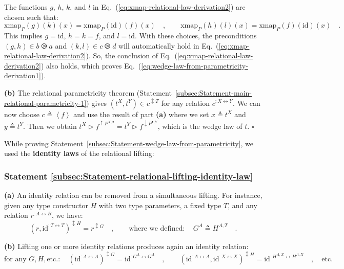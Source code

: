 The functions $g$, $h$, $k$, and $l$ in Eq.~(\ref{eq:xmap-relational-law-derivation2})
are chosen such that:
\[
\text{xmap}_{P}(g)(k)(x)=\text{xmap}_{P}(\text{id})(f)(x)\quad,\quad\quad\text{xmap}_{P}(h)(l)(x)=\text{xmap}_{P}(f)(\text{id})(x)\quad.
\]
This implies $g=\text{id}$, $h=k=f$, and $l=\text{id}$. With these
choices, the preconditions $(g,h)\in b\ogreaterthan a$ and $(k,l)\in c\ogreaterthan d$
will automatically hold in Eq.~(\ref{eq:xmap-relational-law-derivation2}).
So, the conclusion of Eq.~(\ref{eq:xmap-relational-law-derivation2})
also holds, which proves Eq.~(\ref{eq:wedge-law-from-parametricity-derivation1}). 

\textbf{(b)} The relational parametricity theorem (Statement~\ref{subsec:Statement-main-relational-parametricity-1})
gives $(t^{X},t^{Y})\in c^{\updownarrow T}$ for any relation $c^{:X\leftrightarrow Y}$.
We can now choose $c\triangleq\left<f\right>$ and use the result
of part \textbf{(a)} where we set $x\triangleq t^{X}$ and $y\triangleq t^{Y}$.
Then we obtain $t^{X}\triangleright f^{\uparrow P^{X,\bullet}}=t^{Y}\triangleright f^{\downarrow P^{\bullet,Y}}$,
which is the wedge law of $t$. $\square$

While proving Statement~\ref{subsec:Statement-wedge-law-from-parametricity},
we used the \textbf{identity laws}
of the relational lifting:

\subsubsection{Statement \label{subsec:Statement-relational-lifting-identity-law}\ref{subsec:Statement-relational-lifting-identity-law}}

\textbf{(a)} An identity relation can be removed from a simultaneous
lifting. For instance, given any type constructor $H$ with two type
parameters, a fixed type $T$, and any relation $r^{:A\leftrightarrow B}$,
we have: 
\[
(r,\text{id}^{:T\leftrightarrow T})^{\updownarrow H}=r^{\updownarrow G}\quad,\quad\quad\text{where we defined}:\quad G^{A}\triangleq H^{A,T}\quad.
\]

\textbf{(b)} Lifting one or more identity relations produces again
an identity relation: 
\[
\text{for any }G,H,\text{etc}.:\quad(\text{id}^{:A\leftrightarrow A})^{\updownarrow G}=\text{id}^{:G^{A}\leftrightarrow G^{A}}\quad,\quad\quad(\text{id}^{:A\leftrightarrow A},\text{id}^{:X\leftrightarrow X})^{\updownarrow H}=\text{id}^{:H^{A,X}\leftrightarrow H^{A,X}}\quad,\quad\text{etc}.
\]



